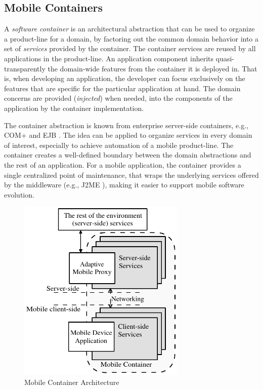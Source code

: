 \subsection{Mobile Containers}

A \textit{software container} is an architectural abstraction that can be used to organize a product-line for a domain, by factoring out the common domain behavior into a set of \textit{services} provided by the container. The container services are reused by all applications in the product-line. An application component inherits quasi-transparently the domain-wide features from the container it is deployed in. That is, when developing an application, the developer can focus exclusively on the features that are specific for the particular application at hand. The domain concerns are provided (\textit{injected}) when needed, into the components of the application by the container implementation. 

The container abstraction is known from enterprise server-side containers, e.g., COM+ \cite{comp.services} and EJB \cite{j2ee14}. The idea can be applied to organize services in every domain of interest, especially to achieve automation of a mobile product-line. The container creates a well-defined boundary between the domain abstractions and the rest of an application. For a mobile application, the container provides a single centralized point of maintenance, that wraps the underlying services offered by the middleware (e.g., J2ME \cite{www.j2me}), making it easier to support mobile software evolution.

\begin{figure}[ht]
	\begin{center}
		\includegraphics[width=8cm,height=!]{ch01/mobc}
	\end{center}
	\caption{Mobile Container Architecture}
	\label{fig:ch01mobc}
\end{figure}

